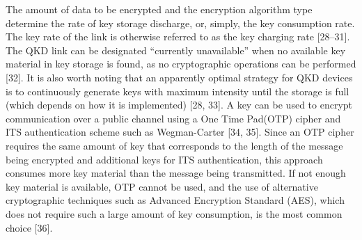 The amount of data to be encrypted and the encryption algorithm type determine the rate of key storage discharge, or, simply, the key consumption rate. The key rate of the link is otherwise referred to as the key charging rate [28–31]. The QKD link can be designated “currently unavailable” when no available key material in key storage is found, as no cryptographic operations can be performed [32]. It is also worth noting that an apparently optimal strategy for QKD devices is to continuously generate keys with maximum intensity until the storage is full (which depends on how it is implemented) [28, 33].
A key can be used to encrypt communication over a public channel using a One Time Pad(OTP) cipher and ITS authentication scheme such as Wegman-Carter [34, 35]. Since an OTP cipher requires the same amount of key that corresponds to the length of the message being encrypted and additional keys for ITS authentication, this approach consumes more key material than the message being transmitted. If not enough key material is available, OTP cannot be used, and the use of alternative cryptographic techniques such as Advanced Encryption Standard (AES), which does not require such a large amount of key consumption, is the most common choice [36].


